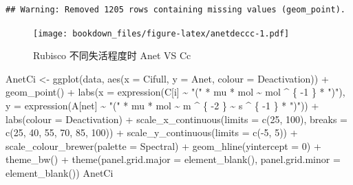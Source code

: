 \documentclass[
]{krantz}
\makeatletter
\newenvironment{Shaded}{\begin{snugshade}}{\end{snugshade}}
\newcommand{\AttributeTok}[1]{\textcolor[rgb]{0.77,0.63,0.00}{#1}}
\newcommand{\DecValTok}[1]{\textcolor[rgb]{0.00,0.00,0.81}{#1}}
\newcommand{\FunctionTok}[1]{\textcolor[rgb]{0.00,0.00,0.00}{#1}}
\newcommand{\NormalTok}[1]{#1}
\newcommand{\OtherTok}[1]{\textcolor[rgb]{0.56,0.35,0.01}{#1}}
\newcommand{\SpecialCharTok}[1]{\textcolor[rgb]{0.00,0.00,0.00}{#1}}
\newcommand{\StringTok}[1]{\textcolor[rgb]{0.31,0.60,0.02}{#1}}
\newenvironment{kframe}{%
\medskip{}
\setlength{\fboxsep}{.8em}
 \def\at@end@of@kframe{}%
 \ifinner\ifhmode%
  \def\at@end@of@kframe{\end{minipage}}%
  \begin{minipage}{\columnwidth}%
 \fi\fi%
 \def\FrameCommand##1{\hskip\@totalleftmargin \hskip-\fboxsep
 \colorbox{shadecolor}{##1}\hskip-\fboxsep
     \hskip-\linewidth \hskip-\@totalleftmargin \hskip\columnwidth}%
 \MakeFramed {\advance\hsize-\width
   \@totalleftmargin\z@ \linewidth\hsize
   \@setminipage}}%
 {\par\unskip\endMakeFramed%
 \at@end@of@kframe}
\renewenvironment{Shaded}{\begin{kframe}}{\end{kframe}}
\makeatother
\begin{document}
\begin{verbatim}
## Warning: Removed 1205 rows containing missing values (geom_point).
\end{verbatim}

\begin{figure}
\centering
\texttt{[image: bookdown\_files/figure-latex/anetdeccc-1.pdf]}
\caption{\label{fig:anetdeccc}Rubisco 不同失活程度时 Anet VS Cc}
\end{figure}

\begin{Shaded}
\begin{Highlighting}[]
\NormalTok{AnetCi }\OtherTok{\textless{}{-}}
  \FunctionTok{ggplot}\NormalTok{(data, }\FunctionTok{aes}\NormalTok{(}\AttributeTok{x =}\NormalTok{ Cifull, }\AttributeTok{y =}\NormalTok{ Anet, }\AttributeTok{colour =}\NormalTok{ Deactivation)) }\SpecialCharTok{+}
  \FunctionTok{geom\_point}\NormalTok{() }\SpecialCharTok{+}
  \FunctionTok{labs}\NormalTok{(}\AttributeTok{x =} \FunctionTok{expression}\NormalTok{(C[i] }\SpecialCharTok{\textasciitilde{}} \StringTok{"("} \SpecialCharTok{*}\NormalTok{ mu }\SpecialCharTok{*}\NormalTok{ mol }\SpecialCharTok{\textasciitilde{}}\NormalTok{ mol }\SpecialCharTok{\^{}}\NormalTok{ \{}
    \SpecialCharTok{{-}}\DecValTok{1}
\NormalTok{  \} }\SpecialCharTok{*} \StringTok{")"}\NormalTok{),}
  \AttributeTok{y =} \FunctionTok{expression}\NormalTok{(A[net] }\SpecialCharTok{\textasciitilde{}} \StringTok{"("} \SpecialCharTok{*}\NormalTok{ mu }\SpecialCharTok{*}\NormalTok{ mol }\SpecialCharTok{\textasciitilde{}}\NormalTok{ m }\SpecialCharTok{\^{}}\NormalTok{ \{}
    \SpecialCharTok{{-}}\DecValTok{2}
\NormalTok{  \} }\SpecialCharTok{\textasciitilde{}}\NormalTok{ s }\SpecialCharTok{\^{}}\NormalTok{ \{}
    \SpecialCharTok{{-}}\DecValTok{1}
\NormalTok{  \} }\SpecialCharTok{*} \StringTok{")"}\NormalTok{)) }\SpecialCharTok{+}
  \FunctionTok{labs}\NormalTok{(}\AttributeTok{colour =} \StringTok{\textquotesingle{}Deactivation\textquotesingle{}}\NormalTok{) }\SpecialCharTok{+}
  \FunctionTok{scale\_x\_continuous}\NormalTok{(}\AttributeTok{limits =} \FunctionTok{c}\NormalTok{(}\DecValTok{25}\NormalTok{, }\DecValTok{100}\NormalTok{),}
                     \AttributeTok{breaks =} \FunctionTok{c}\NormalTok{(}\DecValTok{25}\NormalTok{, }\DecValTok{40}\NormalTok{, }\DecValTok{55}\NormalTok{, }\DecValTok{70}\NormalTok{, }\DecValTok{85}\NormalTok{, }\DecValTok{100}\NormalTok{)) }\SpecialCharTok{+}
  \FunctionTok{scale\_y\_continuous}\NormalTok{(}\AttributeTok{limits =} \FunctionTok{c}\NormalTok{(}\SpecialCharTok{{-}}\DecValTok{5}\NormalTok{, }\DecValTok{5}\NormalTok{)) }\SpecialCharTok{+}
  \FunctionTok{scale\_colour\_brewer}\NormalTok{(}\AttributeTok{palette =} \StringTok{\textquotesingle{}Spectral\textquotesingle{}}\NormalTok{) }\SpecialCharTok{+}
  \FunctionTok{geom\_hline}\NormalTok{(}\AttributeTok{yintercept =} \DecValTok{0}\NormalTok{) }\SpecialCharTok{+}
  \FunctionTok{theme\_bw}\NormalTok{() }\SpecialCharTok{+}
  \FunctionTok{theme}\NormalTok{(}\AttributeTok{panel.grid.major =} \FunctionTok{element\_blank}\NormalTok{(),}
        \AttributeTok{panel.grid.minor =} \FunctionTok{element\_blank}\NormalTok{())}
\NormalTok{AnetCi}
\end{Highlighting}
\end{Shaded}
\end{document}
